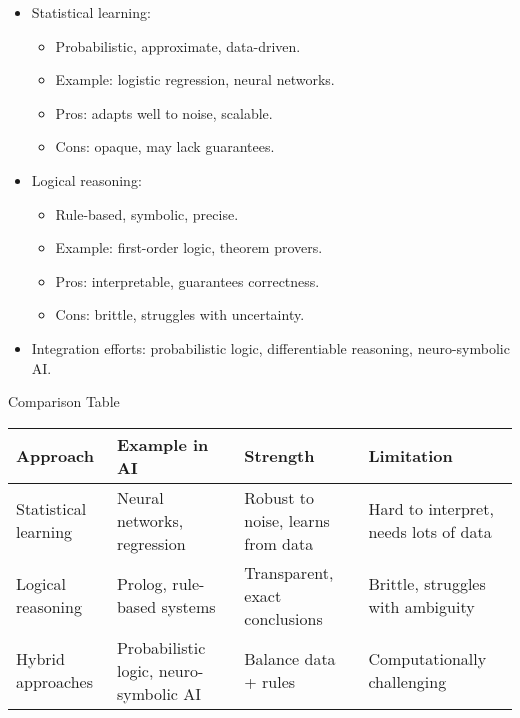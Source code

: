 \documentclass[
  letterpaper,
  DIV=11,
  numbers=noendperiod]{scrreprt}
\providecommand{\tightlist}{%
  \setlength{\itemsep}{0pt}\setlength{\parskip}{0pt}}
\begin{document}
\begin{itemize}
\item
  Statistical learning:

  \begin{itemize}
  \tightlist
  \item
    Probabilistic, approximate, data-driven.
  \item
    Example: logistic regression, neural networks.
  \item
    Pros: adapts well to noise, scalable.
  \item
    Cons: opaque, may lack guarantees.
  \end{itemize}
\item
  Logical reasoning:

  \begin{itemize}
  \tightlist
  \item
    Rule-based, symbolic, precise.
  \item
    Example: first-order logic, theorem provers.
  \item
    Pros: interpretable, guarantees correctness.
  \item
    Cons: brittle, struggles with uncertainty.
  \end{itemize}
\item
  Integration efforts: probabilistic logic, differentiable reasoning,
  neuro-symbolic AI.
\end{itemize}

Comparison Table

\begin{longtable}[]{@{}
  >{\raggedright\arraybackslash}p{}
  >{\raggedright\arraybackslash}p{}
  >{\raggedright\arraybackslash}p{}
  >{\raggedright\arraybackslash}p{}@{}}
\toprule\noalign{}
\begin{minipage}[b]{\linewidth}\raggedright
Approach
\end{minipage} & \begin{minipage}[b]{\linewidth}\raggedright
Example in AI
\end{minipage} & \begin{minipage}[b]{\linewidth}\raggedright
Strength
\end{minipage} & \begin{minipage}[b]{\linewidth}\raggedright
Limitation
\end{minipage} \\
\midrule\noalign{}
\endhead
\bottomrule\noalign{}
\endlastfoot
Statistical learning & Neural networks, regression & Robust to noise,
learns from data & Hard to interpret, needs lots of data \\
Logical reasoning & Prolog, rule-based systems & Transparent, exact
conclusions & Brittle, struggles with ambiguity \\
Hybrid approaches & Probabilistic logic, neuro-symbolic AI & Balance
data + rules & Computationally challenging \\
\end{longtable}
\end{document}
